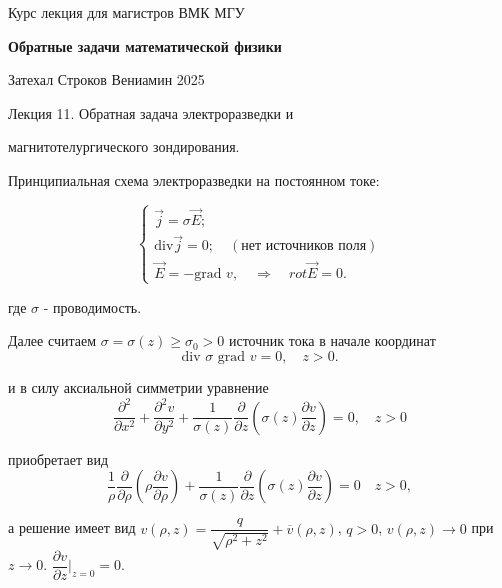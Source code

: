 \documentclass{article}
\begin{document}
\centerline{\large Курс лекция для магистров ВМК МГУ}
\centerline {\textbf{\LARGE Обратные задачи математической физики}}
\centerline {Затехал Строков Вениамин 2025}

\vspace{0.4cm}

\centerline{\LARGE 	Лекция 11. Обратная задача электроразведки и }
\centerline{\LARGE магнитотелургического зондирования.}

\vspace{0.5cm}

Принципиальная схема электроразведки на постоянном токе:


\begin{equation}
\begin{cases}
	\overrightarrow{j} = \sigma \overrightarrow{E};\\
	\text{div} \overrightarrow{j} = 0; \quad (\text{нет источников поля})\\
	\overrightarrow{E} = - \text{grad } v, \quad \Rightarrow \quad rot \overrightarrow{E} = 0. 
\end{cases}
\end{equation}

где $\sigma$ - проводимость. 

Далее считаем $\sigma = \sigma(z) \geqslant \sigma_0 > 0$ источник тока в начале координат
\begin{equation*}
	\text{div } \sigma \text{ grad } v = 0, \quad z > 0.
\end{equation*}

и в силу аксиальной симметрии уравнение
\begin{equation*}
	\dfrac{\partial^2}{\partial x^2} + \dfrac{\partial^2 v}{\partial y^2} + \dfrac{1}{\sigma(z)}\dfrac{\partial}{\partial z} ( \sigma(z) \dfrac{\partial v}{\partial z}) = 0, \quad z > 0
\end{equation*}

приобретает вид
\begin{equation*}
	\dfrac{1}{\rho} \dfrac{\partial}{\partial \rho} \left( \rho \dfrac{\partial v}{\partial \rho} \right) +
	 \dfrac{1}{\sigma(z)} \dfrac{\partial}{\partial z} \left( \sigma(z) \dfrac{\partial v}{\partial z} \right) = 0
	 \quad z > 0,
\end{equation*}

а решение имеет вид $v(\rho, z) = \dfrac{q}{\sqrt{\rho^2 + z^2}} + \overline{v}(\rho,z)$, $q > 0$, $v(\rho,z) \rightarrow 0$ при $z \rightarrow 0$.
$\dfrac{\partial v}{\partial z} \bigg|_{z=0} = 0$.
\end{document}
